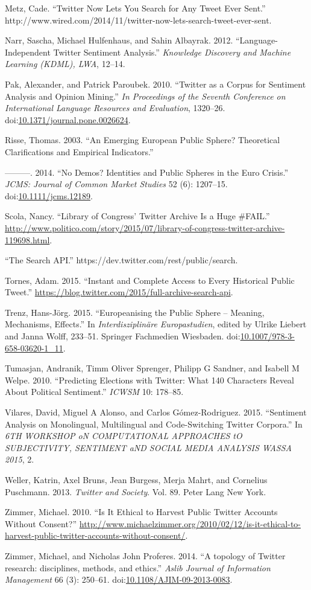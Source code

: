 \documentclass[]{article}
\begin{document}
Metz, Cade. ``Twitter Now Lets You Search for Any Tweet Ever Sent.''
http://www.wired.com/2014/11/twitter-now-lets-search-tweet-ever-sent.

Narr, Sascha, Michael Hulfenhaus, and Sahin Albayrak. 2012.
``Language-Independent Twitter Sentiment Analysis.'' \emph{Knowledge
Discovery and Machine Learning (KDML), LWA}, 12--14.

Pak, Alexander, and Patrick Paroubek. 2010. ``Twitter as a Corpus for
Sentiment Analysis and Opinion Mining.'' \emph{In Proceedings of the
Seventh Conference on International Language Resources and Evaluation},
1320--26.
doi:\href{http://dx.doi.org/10.1371/journal.pone.0026624}{10.1371/journal.pone.0026624}.

Risse, Thomas. 2003. ``An Emerging European Public Sphere? Theoretical
Clarifications and Empirical Indicators.''

---------. 2014. ``No Demos? Identities and Public Spheres in the Euro
Crisis.'' \emph{JCMS: Journal of Common Market Studies} 52 (6):
1207--15.
doi:\href{http://dx.doi.org/10.1111/jcms.12189}{10.1111/jcms.12189}.

Scola, Nancy. ``Library of Congress' Twitter Archive Is a Huge \#FAIL.''
\url{http://www.politico.com/story/2015/07/library-of-congress-twitter-archive-119698.html}.

``The Search API.'' https://dev.twitter.com/rest/public/search.

Tornes, Adam. 2015. ``Instant and Complete Access to Every Historical
Public Tweet.''
\url{https://blog.twitter.com/2015/full-archive-search-api}.

Trenz, Hans-Jörg. 2015. ``Europeanising the Public Sphere -- Meaning,
Mechanisms, Effects.'' In \emph{Interdisziplinäre Europastudien}, edited
by Ulrike Liebert and Janna Wolff, 233--51. Springer Fachmedien
Wiesbaden.
doi:\href{http://dx.doi.org/10.1007/978-3-658-03620-1_11}{10.1007/978-3-658-03620-1\_11}.

Tumasjan, Andranik, Timm Oliver Sprenger, Philipp G Sandner, and Isabell
M Welpe. 2010. ``Predicting Elections with Twitter: What 140 Characters
Reveal About Political Sentiment.'' \emph{ICWSM} 10: 178--85.

Vilares, David, Miguel A Alonso, and Carlos G{ó}mez-Rodr{i}guez. 2015.
``Sentiment Analysis on Monolingual, Multilingual and Code-Switching
Twitter Corpora.'' In \emph{6TH WORKSHOP oN COMPUTATIONAL APPROACHES tO
SUBJECTIVITY, SENTIMENT aND SOCIAL MEDIA ANALYSIS WASSA 2015}, 2.

Weller, Katrin, Axel Bruns, Jean Burgess, Merja Mahrt, and Cornelius
Puschmann. 2013. \emph{Twitter and Society}. Vol. 89. Peter Lang New
York.

Zimmer, Michael. 2010. ``Is It Ethical to Harvest Public Twitter
Accounts Without Consent?''
\url{http://www.michaelzimmer.org/2010/02/12/is-it-ethical-to-harvest-public-twitter-accounts-without-consent/}.

Zimmer, Michael, and Nicholas John Proferes. 2014. ``A topology of
Twitter research: disciplines, methods, and ethics.'' \emph{Aslib
Journal of Information Management} 66 (3): 250--61.
doi:\href{http://dx.doi.org/10.1108/AJIM-09-2013-0083}{10.1108/AJIM-09-2013-0083}.
\end{document}
